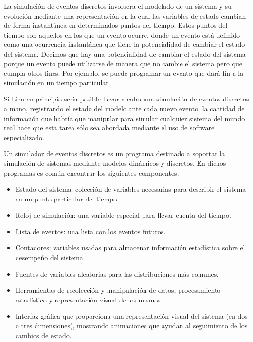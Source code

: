 La simulación de eventos discretos involucra el modelado de un sistema y su
evolución mediante una representación en la cual las variables de estado
cambian de forma instantánea en determinados puntos del tiempo. Estos puntos
del tiempo son aquellos en los que un evento ocurre, donde un evento está
definido como una ocurrencia instantánea que tiene la potencialidad de cambiar
el estado del sistema. Decimos que hay una potencialidad de cambiar el estado
del sistema porque un evento puede utilizarse de manera que no cambie el
sistema pero que cumpla otros fines. Por ejemplo, se puede programar un evento
que dará fin a la simulación en un tiempo particular.

Si bien en principio sería posible llevar a cabo una simulación de eventos
discretos a mano, registrando el estado del modelo ante cada nuevo evento, la
cantidad de información que habría que manipular para simular cualquier sistema
del mundo real hace que esta tarea sólo sea abordada mediante el uso de
software especializado.

Un simulador de eventos discretos es un programa destinado a soportar la
simulación de sistemas mediante modelos dinámicos y discretos. En dichos
programas es común encontrar los siguientes componentes:

\begin{itemize}
    \item Estado del sistema: colección de variables necesarias para describir
el sistema en un punto particular del tiempo.

    \item Reloj de simulación: una variable especial para llevar cuenta del
tiempo.

    \item Lista de eventos: una lista con los eventos futuros.

    \item Contadores: variables usadas para almacenar información estadística
sobre el desempeño del sistema.

    \item Fuentes de variables aleatorias para las distribuciones más comunes.

    \item Herramientas de recolección y manipulación de datos, procesamiento
estadístico y representación visual de los mismos.

    \item Interfaz gráfica que proporciona una representación visual del
sistema (en dos o tres dimensiones), mostrando animaciones que ayudan al
seguimiento de los cambios de estado.
\end{itemize}


